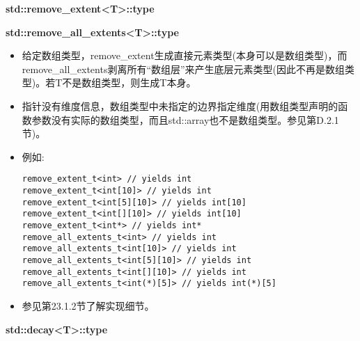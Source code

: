 \textbf{std::remove\_extent<T>::type}

\textbf{std::remove\_all\_extents<T>::type}

\begin{itemize}
\item
给定数组类型，remove\_extent生成直接元素类型(本身可以是数组类型)，而remove\_all\_extents剥离所有“数组层”来产生底层元素类型(因此不再是数组类型)。若T不是数组类型，则生成T本身。

\item
指针没有维度信息，数组类型中未指定的边界指定维度(用数组类型声明的函数参数没有实际的数组类型，而且std::array也不是数组类型。参见第D.2.1节)。

\item
例如:
\begin{lstlisting}[style=styleCXX]
remove_extent_t<int> // yields int
remove_extent_t<int[10]> // yields int
remove_extent_t<int[5][10]> // yields int[10]
remove_extent_t<int[][10]> // yields int[10]
remove_extent_t<int*> // yields int*
remove_all_extents_t<int> // yields int
remove_all_extents_t<int[10]> // yields int
remove_all_extents_t<int[5][10]> // yields int
remove_all_extents_t<int[][10]> // yields int
remove_all_extents_t<int(*)[5]> // yields int(*)[5]
\end{lstlisting}

\item
参见第23.1.2节了解实现细节。
\end{itemize}

\textbf{std::decay<T>::type}

